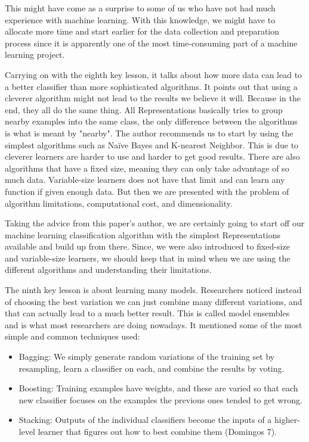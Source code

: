 \documentclass[a4paper,12pt]{report}
\begin{document}
This might have come as a surprise to some of us who have not had much experience with machine learning. With this knowledge, we might have to allocate more time and start earlier for the data collection and preparation process since it is apparently one of the most time-consuming part of a machine learning project.

Carrying on with the eighth key lesson, it talks about how more data can lead to a better classifier than more sophisticated algorithms. It points out that using a cleverer algorithm might not lead to the results we believe it will. Because in the end, they all do the same thing. All Representations basically tries to group nearby examples into the same class, the only difference between the algorithms is what is meant by "nearby". The author recommends us to start by using the simplest algorithms such as Naïve Bayes and K-nearest Neighbor. This is due to cleverer learners are harder to use and harder to get good results. There are also algorithms that have a fixed size, meaning they can only take advantage of so much data. Variable-size learners does not have that limit and can learn any function if given enough data. But then we are presented with the problem of algorithm limitations, computational cost, and dimensionality.

Taking the advice from this paper’s author, we are certainly going to start off our machine learning classification algorithm with the simplest Representations available and build up from there. Since, we were also introduced to fixed-size and variable-size learners, we should keep that in mind when we are using the different algorithms and understanding their limitations.

The ninth key lesson is about learning many models. Researchers noticed instead of choosing the best variation we can just combine many different variations, and that can actually lead to a much better result. This is called model ensembles and is what most researchers are doing nowadays. It mentioned some of the most simple and common techniques used:

\begin{itemize}[,]
    \setlength\itemsep{-.1cm}
    \item Bagging: We simply generate random variations of the training set by resampling, learn a classifier on each, and combine the results by voting.
    \item Boosting: Training examples have weights, and these are varied so that each new classifier focuses on the examples the previous ones tended to get wrong.
    \item Stacking: Outputs of the individual classifiers become the inputs of a higher-level learner that figures out how to best combine them (Domingos 7).
\end{itemize}
\end{document}

